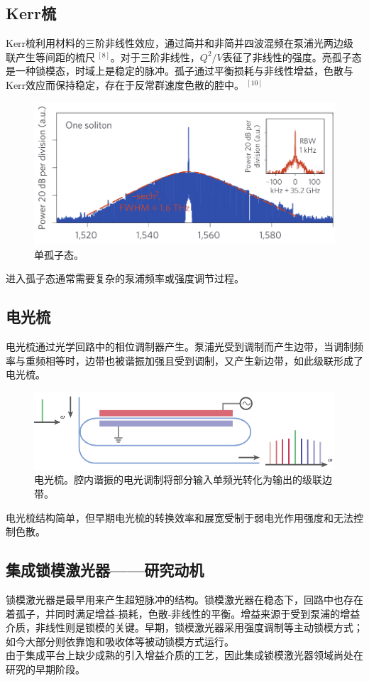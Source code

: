\subsection{Kerr梳}
Kerr梳利用材料的三阶非线性效应，通过简并和非简并四波混频在泵浦光两边级联产生等间距的梳尺$~^{[8]}$。对于三阶非线性，$Q^2/V$表征了非线性的强度。亮孤子态是一种锁模态，时域上是稳定的脉冲。孤子通过平衡损耗与非线性增益，色散与Kerr效应而保持稳定，存在于反常群速度色散的腔中。$~^{[10]}$\\
\begin{figure}[htbp]
    \centering
    \includegraphics[width=0.7\linewidth]{figure/fig_6.png}
    \caption{单孤子态。}
    \label{fig:enter-label}
\end{figure}
进入孤子态通常需要复杂的泵浦频率或强度调节过程。
\subsection{电光梳}
电光梳通过光学回路中的相位调制器产生。泵浦光受到调制而产生边带，当调制频率与重频相等时，边带也被谐振加强且受到调制，又产生新边带，如此级联形成了电光梳。\\
\begin{figure}[htbp]
    \centering
    \includegraphics[width=0.7\linewidth]{figure/fig_5.png}
    \caption{电光梳。腔内谐振的电光调制将部分输入单频光转化为输出的级联边带。}
    \label{fig:enter-label}
\end{figure}
电光梳结构简单，但早期电光梳的转换效率和展宽受制于弱电光作用强度和无法控制色散。
\subsection{集成锁模激光器——研究动机}
锁模激光器是最早用来产生超短脉冲的结构。锁模激光器在稳态下，回路中也存在着孤子，并同时满足增益-损耗，色散-非线性的平衡。增益来源于受到泵浦的增益介质，非线性则是锁模的关键。早期，锁模激光器采用强度调制等主动锁模方式；如今大部分则依靠饱和吸收体等被动锁模方式运行。\\
由于集成平台上缺少成熟的引入增益介质的工艺，因此集成锁模激光器领域尚处在研究的早期阶段。
